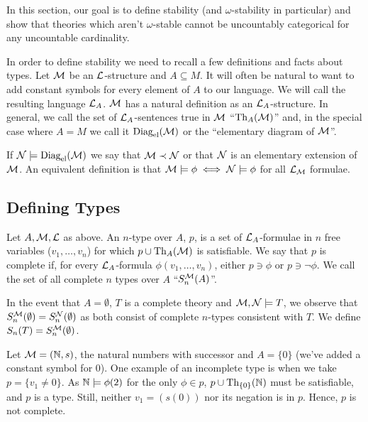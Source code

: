 In this section, our goal is to define stability (and \(\omega\)-stability in particular) and show that theories which aren't \(\omega\)-stable cannot be uncountably categorical for any uncountable cardinality. 

In order to define stability we need to recall a few definitions and facts about types. 
Let \(\mathcal{M}\) be an \(\mathcal{L}\)-structure and \(A \subseteq M\). 
It will often be natural to want to add constant symbols for every element of \(A\) to our language. 
We will call the resulting language \(\mathcal{L}_A\). \(\mathcal{M}\) has a natural definition as an \(\mathcal{L}_A\)-structure. 
In general, we call the set of \(\mathcal{L}_A\)-sentences true in \(\mathcal{M}\) ``\(\text{Th}_A(\mathcal{M})\)'' and, in the special case where \(A = M\) we call it \(\text{Diag}_\text{el}(\mathcal{M})\) or the ``elementary diagram of \(\mathcal{M}\)''. 

If \(\mathcal{N} \models \text{Diag}_\text{el}(\mathcal{M})\) we say that \(\mathcal{M} \prec \mathcal{N}\) or that \(\mathcal{N}\) is an elementary extension of \(\mathcal{M}\). 
An equivalent definition is that \(\mathcal{M} \models \phi \iff \mathcal{N} \models \phi\) for all \(\mathcal{L}_{\mathcal{M}}\) formulae. 

\subsection{Defining Types}

\begin{definition}\label{def_types}
Let \(A, \mathcal{M}, \mathcal{L}\) as above. 
An \(n\)-type over \(A\), \(p\), is a set of \(\mathcal{L}_A\)-formulae in \(n\) free variables (\(v_1, \ldots, v_n\)) for which \(p \cup \text{Th}_A(\mathcal{M})\) is satisfiable.
We say that \(p\) is complete if, for every \(\mathcal{L}_A\)-formula \(\phi(v_1, \ldots, v_n)\), either \(p \ni \phi\) or \(p \ni \neg \phi\). 
We call the set of all complete \(n\) types over \(A\) ``\(S_n^{\mathcal{M}}(A)\)''. 

In the event that \(A = \emptyset\), \(T\) is a complete theory and \(\mathcal{M}, \mathcal{N} \models T\), we observe that \(S_n^{\mathcal{M}}(\emptyset) = S_n^{\mathcal{N}}(\emptyset)\) as both consist of complete \(n\)-types consistent with \(T\). 
We define \(S_n(T) = S_n^{\mathcal{M}}(\emptyset)\).
\end{definition}

\begin{example}\label{example_types_natural_numbers} 
Let \(\mathcal{M} = (\mathbb{N},s)\), the natural numbers with successor and \(A = \{0\}\) (we've added a constant symbol for 0). 
One example of an incomplete type is when we take \(p = \{v_1 \neq 0\}\). 
As \(\mathbb{N} \models \phi(2)\) for the only \(\phi \in p\), \(p \cup \text{Th}_{\{0\}}(\mathbb{N})\) must be satisfiable, and \(p\) is a type. 
Still, neither \(v_1 = (s(0))\) nor its negation is in \(p\).
Hence, \(p\) is not complete. 
\end{example}

